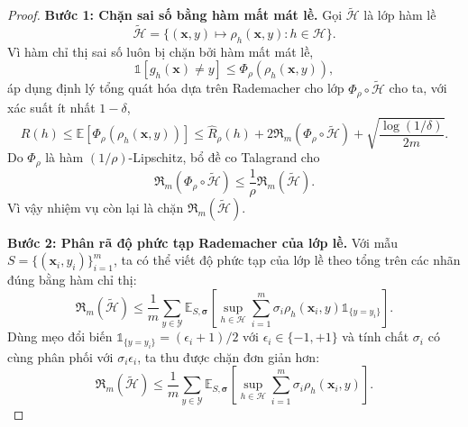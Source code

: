 \begin{proof}
\textbf{Bước 1: Chặn sai số bằng hàm mất mát lề.}
Gọi $\widetilde{\mathcal{H}}$ là lớp hàm lề
\[
  \widetilde{\mathcal{H}}=\{(\bm{x},y)\mapsto \rho_h(\bm{x},y):h\in\mathcal{H}\}.
\]
Vì hàm chỉ thị sai số luôn bị chặn bởi hàm mất mát lề,
\[
  \mathbb{1}[g_h(\bm{x})\neq y]
  \leq \Phi_\rho(\rho_h(\bm{x},y)),
\]
áp dụng định lý tổng quát hóa dựa trên Rademacher cho lớp $\Phi_\rho\circ\widetilde{\mathcal{H}}$ cho ta, với xác suất ít nhất $1-\delta$,
\[
  R(h)\leq \mathbb{E}[\Phi_\rho(\rho_h(\bm{x},y))]
  \leq \widehat{R}_\rho(h)
  +2\mathfrak{R}_m(\Phi_\rho\circ\widetilde{\mathcal{H}})
  +\sqrt{\frac{\log(1/\delta)}{2m}}.
\]
Do $\Phi_\rho$ là hàm $(1/\rho)$-Lipschitz, bổ đề co Talagrand cho
\[
  \mathfrak{R}_m(\Phi_\rho\circ\widetilde{\mathcal{H}})
  \leq \frac{1}{\rho}\mathfrak{R}_m(\widetilde{\mathcal{H}}).
\]
Vì vậy nhiệm vụ còn lại là chặn $\mathfrak{R}_m(\widetilde{\mathcal{H}})$.

\textbf{Bước 2: Phân rã độ phức tạp Rademacher của lớp lề.}
Với mẫu $S=\{(\bm{x}_i,y_i)\}_{i=1}^{m}$, ta có thể viết độ phức tạp của lớp lề theo tổng trên các nhãn đúng bằng hàm chỉ thị:
\[
  \mathfrak{R}_m(\widetilde{\mathcal{H}})
  \leq \frac{1}{m}\sum_{y\in\mathcal{Y}}\mathbb{E}_{S,\bm{\sigma}}
  \left[\sup_{h\in\mathcal{H}}\sum_{i=1}^{m}\sigma_i
  \rho_h(\bm{x}_i,y)\mathbb{1}_{\{y=y_i\}}\right].
\]
Dùng mẹo đổi biến $\mathbb{1}_{\{y=y_i\}}=(\epsilon_i+1)/2$ với $\epsilon_i\in\{-1,+1\}$ và tính chất $\sigma_i$ có cùng phân phối với $\sigma_i\epsilon_i$, ta thu được chặn đơn giản hơn:
\[
  \mathfrak{R}_m(\widetilde{\mathcal{H}})
  \leq \frac{1}{m}\sum_{y\in\mathcal{Y}}\mathbb{E}_{S,\bm{\sigma}}
  \left[\sup_{h\in\mathcal{H}}\sum_{i=1}^{m}\sigma_i
  \rho_h(\bm{x}_i,y)\right].
\]


\end{proof}
